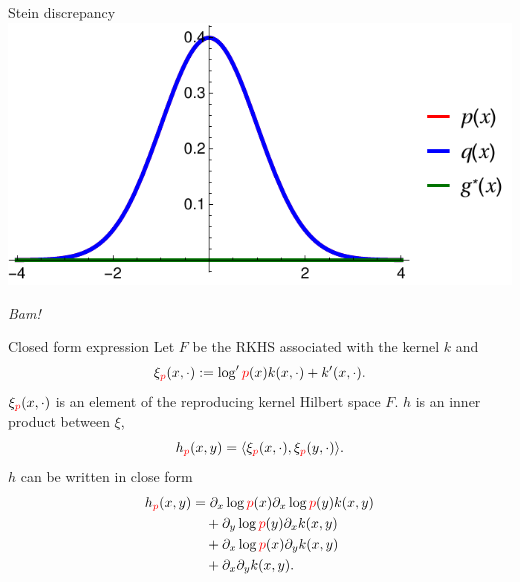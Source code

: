 \begin{frame}
\begin{columns}
\begin{column}{.33\linewidth}
\begin{block}{Stein discrepancy}
\includegraphics[scale=1.2]{../../presentation/img/s0.pdf}
\vspace{1cm}
\begin{center}
\emph{Bam!}
\end{center}
\end{block}



\vspace{-0.75cm}
\begin{block}{Closed form expression}
 Let $F$ be the RKHS associated with the kernel $k$ and 
\large
 \begin{equation*}
\xi_{{ \color{red} p}}(x,\cdot):=\log' { \color{red} p}(x) k(x,\cdot)+  k'(x,\cdot).
\end{equation*}
 $\xi_{{ \color{red} p}}(x,\cdot)$ is an element of the reproducing kernel Hilbert
space $F$.  $h$ is an  inner product between $\xi$, 
\[
h_{{\color{red} p}}(x,y)   = \langle\xi_{{ \color{red} p}}(x,\cdot),\xi_{{ \color{red} p}}(y,\cdot)\rangle. 
\]
$h$ can be written in close form
\large
\begin{align*}
h_{{\color{red} p}}(x,y) & = \partial_{x} \log {\color{red} p}(x) \partial_{x} \log {\color{red} p}(y) k(x,y)\\
 & \quad+\partial_{y} \log {\color{red} p}(y) \partial_{x}  k(x,y)\\
 & \quad+\partial_{x} \log {\color{red} p}(x) \partial_{y}k(x,y)\\
 & \quad+\partial_{x} \partial_{y} k(x,y).
\end{align*}
\end{block}

\vspace{-0.75cm}



 



\end{column}
\end{columns}
\end{frame}
